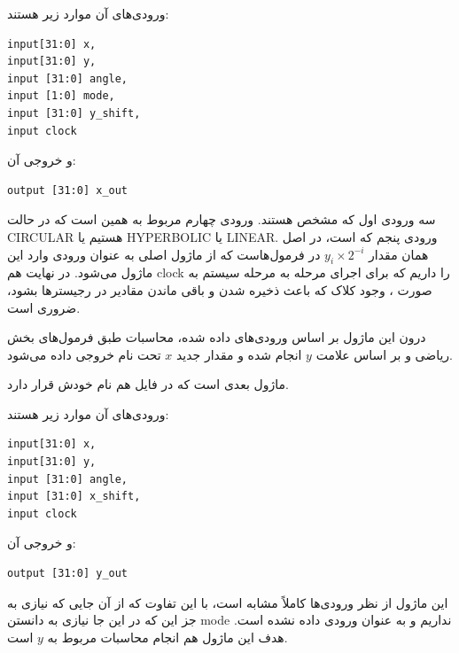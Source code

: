 \documentclass[12pt,titlepage,a4page , tikz , multi,table , svgnames,xcdraw]{article}
\begin{document}
 
 ورودی‌های آن موارد زیر هستند:

\begin{latin}
\begin{verbatim}
input[31:0] x,
input[31:0] y,
input [31:0] angle,
input [1:0] mode,
input [31:0] y_shift,
input clock
\end{verbatim}
\end{latin}

و خروجی آن:

\begin{latin}
\begin{verbatim}
output [31:0] x_out
\end{verbatim}
\end{latin}

سه ورودی اول که مشخص هستند. ورودی چهارم مربوط به همین است که در حالت CIRCULAR هستیم یا HYPERBOLIC یا LINEAR. ورودی پنجم که  است، در اصل همان مقدار $y_i \times 2^{-i}$ در فرمول‌هاست که از ماژول اصلی به عنوان ورودی وارد این ماژول می‌شود. در نهایت هم clock را داریم که برای اجرای مرحله به مرحله سیستم به صورت ، وجود کلاک که باعث ذخیره شدن و باقی ماندن مقادیر در رجیسترها بشود، ضروری است.

درون این ماژول بر اساس ورودی‌های داده شده، محاسبات طبق فرمول‌های بخش ریاضی و بر اساس علامت $y$ انجام شده و مقدار جدید $x$ تحت نام  خروجی داده می‌شود.

\hrulefill
 

ماژول بعدی  است که در فایل هم نام خودش قرار دارد.

 
 ورودی‌های آن موارد زیر هستند:

\begin{latin}
\begin{verbatim}
input[31:0] x,
input[31:0] y,
input [31:0] angle,
input [31:0] x_shift,
input clock
\end{verbatim}
\end{latin}

و خروجی آن:

\begin{latin}
\begin{verbatim}
output [31:0] y_out
\end{verbatim}
\end{latin}

این ماژول از نظر ورودی‌ها کاملاً مشابه  است، با این تفاوت که از آن جایی که نیازی به جز این که در این جا نیازی به دانستن mode نداریم و به عنوان ورودی داده نشده است. هدف این ماژول هم انجام محاسبات مربوط به $y$ است.
\end{document}
